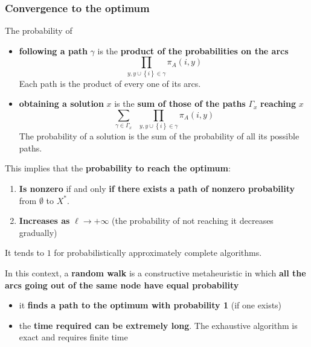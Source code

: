 \documentclass[11pt]{article}
\begin{document}
	\newpage
	
	\subsubsection{Convergence to the optimum}
	The probability of
	\begin{itemize}
		\item \textbf{following a path} $\gamma$ is the \textbf{product of the probabilities on the arcs}
		$$ \prod_{y, y \cup \left\{i\right\} \in \gamma} \pi_A (i, y) $$
		Each path is the product of every one of its arcs.\\
		
		\item \textbf{obtaining a solution} $x$ is the \textbf{sum of those of the paths} $\Gamma_x$ \textbf{reaching} $x$
		$$ \sum_{\gamma \in \Gamma_x} \;\; \prod_{y, y \cup \left\{i\right\} \in \gamma} \pi_A (i,y) $$
		The probability of a solution is the sum of the probability of all its possible paths.\\
	\end{itemize}
	
	This implies that the \textbf{probability to reach the optimum}:
	\begin{enumerate}
		\item \textbf{Is nonzero} if and only \textbf{if there exists a path of nonzero probability} from $\emptyset$ to $X^\ast$.\\
		
		\item \textbf{Increases as} $\ell \rightarrow + \infty$ (the probability of not reaching it decreases gradually)
	\end{enumerate}
	
	It tends to $1$ for probabilistically approximately complete algorithms.\\
	
	\newpage
	
	In this context, a \textbf{random walk} is a constructive metaheuristic in which \textbf{all the arcs going out of the same node have equal probability}
	\begin{itemize}
		\item it \textbf{finds a path to the optimum with probability 1} (if one exists)
		
		\item the \textbf{time required can be extremely long}. The exhaustive algorithm is exact and requires finite time
	\end{itemize}
	
\end{document}
